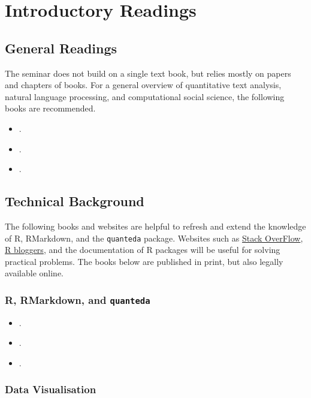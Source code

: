 \documentclass[abstract=on,parskip=full,headings=standardclasses,fontsize=11pt,paper=a4]{scrartcl}
\begin{document}
\section*{Introductory Readings}

\subsection*{General Readings}

The seminar does not build on a single text book, but relies mostly on papers and chapters of books. For  a general overview of quantitative text analysis, natural language processing, and computational social science, the following books are recommended.

\begin{itemize}
\item {}.
\item {}.
\item {}.
\end{itemize}


\subsection*{Technical Background}

The following books and websites are helpful to refresh and extend the knowledge of  \textsf{R}, RMarkdown, and the \texttt{quanteda} package.  Websites such as \href{https://stackoverflow.com/}{Stack OverFlow}, \href{https://www.r-bloggers.com}{R bloggers}, and the documentation of \textsf{R} packages will be useful for solving practical problems. The books below are published in print, but also legally available online.

\subsubsection*{\textsf{R}, RMarkdown, and \texttt{quanteda}}
\begin{itemize}
\item {}.
\item {}.
\item {}.
\end{itemize}

\subsubsection*{Data Visualisation}
\end{document}
